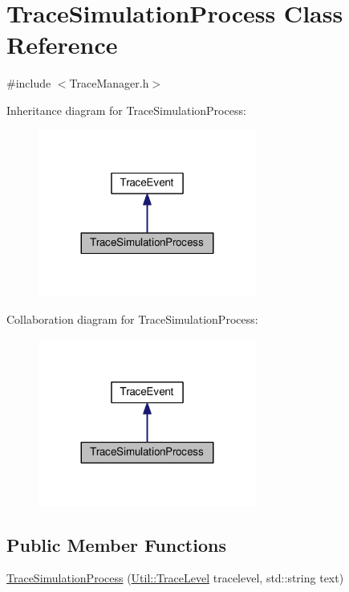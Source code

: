 \hypertarget{class_trace_simulation_process}{}\section{Trace\+Simulation\+Process Class Reference}
\label{class_trace_simulation_process}


{\ttfamily \#include $<$Trace\+Manager.\+h$>$}



Inheritance diagram for Trace\+Simulation\+Process\+:\nopagebreak
\begin{figure}[H]
\begin{center}
\leavevmode
\includegraphics[width=203pt]{class_trace_simulation_process__inherit__graph}
\end{center}
\end{figure}


Collaboration diagram for Trace\+Simulation\+Process\+:\nopagebreak
\begin{figure}[H]
\begin{center}
\leavevmode
\includegraphics[width=203pt]{class_trace_simulation_process__coll__graph}
\end{center}
\end{figure}
\subsection*{Public Member Functions}
\begin{DoxyCompactItemize}
\item 
\hyperlink{class_trace_simulation_process_a20762e9f477719c87c135896e345f4a6}{Trace\+Simulation\+Process} (\hyperlink{class_util_a0a3482cfa2d915e261c0cf528fdc7afc}{Util\+::\+Trace\+Level} tracelevel, std\+::string text)
\end{DoxyCompactItemize}


